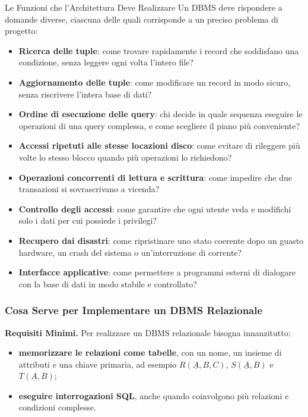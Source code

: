 \documentclass[12pt]{extarticle}
\begin{document}
\begin{cbox}{Le Funzioni che l'Architettura Deve Realizzare}
\noindent Un DBMS deve rispondere a domande diverse, ciascuna delle quali corrisponde a un preciso problema di progetto:
\begin{itemize}
    \item \textbf{Ricerca delle tuple}: come trovare rapidamente i record che soddisfano una condizione, senza leggere ogni volta l'intero file?
    \item \textbf{Aggiornamento delle tuple}: come modificare un record in modo sicuro, senza riscrivere l'intera base di dati?
    \item \textbf{Ordine di esecuzione delle query}: chi decide in quale sequenza eseguire le operazioni di una query complessa, e come scegliere il piano più conveniente?
    \item \textbf{Accessi ripetuti alle stesse locazioni disco}: come evitare di rileggere più volte lo stesso blocco quando più operazioni lo richiedono?
    \item \textbf{Operazioni concorrenti di lettura e scrittura}: come impedire che due transazioni si sovrascrivano a vicenda?
    \item \textbf{Controllo degli accessi}: come garantire che ogni utente veda e modifichi solo i dati per cui possiede i privilegi?
    \item \textbf{Recupero dai disastri}: come ripristinare uno stato coerente dopo un guasto hardware, un crash del sistema o un'interruzione di corrente?
    \item \textbf{Interfacce applicative}: come permettere a programmi esterni di dialogare con la base di dati in modo stabile e controllato?
\end{itemize}
\end{cbox}

\subsubsection{Cosa Serve per Implementare un DBMS Relazionale}

\noindent \textbf{Requisiti Minimi.} Per realizzare un DBMS relazionale bisogna innanzitutto:
\begin{itemize}
    \item \textbf{memorizzare le relazioni come tabelle}, con un nome, un insieme di attributi e una chiave primaria, ad esempio $R(\underline{A}, B, C)$, $S(\underline{A}, B)$ e $T(\underline{A}, B)$;
    \item \textbf{eseguire interrogazioni SQL}, anche quando coinvolgono più relazioni e condizioni complesse.
\end{itemize}
\end{document}
